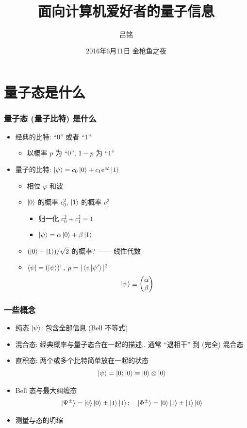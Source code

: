 \documentclass[12pt,hyperref={CJKbookmarks=true},aspectratio=169]{beamer}
\title{面向计算机爱好者的量子信息}
\author{吕铭}
\institute{物理系毕业狗}
\date{2016年6月11日 金枪鱼之夜}
\newcommand\mi{\mathrm{i}}
\newcommand\e{\mathrm{e}} %
\begin{document}
\maketitle


\section{量子态是什么}
\begin{frame}[t]\frametitle{量子态 (量子比特) 是什么}
\begin{itemize}
	\item 经典的比特: ``$0$'' 或者 ``$1$''
	\begin{itemize}
		\item 以概率 $p$ 为 ``$0$'', $1-p$ 为 ``$1$''
	\end{itemize}
	\item 量子的比特: $\ket{\psi} = c_0\ket 0 + c_1\e^{\mi\varphi}\ket 1$
	\begin{itemize}
		\item 相位 $\varphi$ 和波
		\item $\ket 0$ 的概率 $c_0^2$, $\ket 1$ 的概率 $c_1^2$
		\begin{itemize}
			\item 归一化 $c_0^2 + c_1^2 = 1$
			\item $\ket{\psi} = \alpha\ket 0 + \beta\ket 1$
		\end{itemize}
		\item $(\ket 0 + \ket 1)/\sqrt 2$ 的概率? ------ 线性代数
		\item $\bra \psi = (\ket \psi)^\dagger$, $p = |\braket{\psi|\psi'}|^2$
		$$
		\ket\psi \equiv \begin{pmatrix}
			\alpha \\ \beta
		\end{pmatrix}
		$$
	\end{itemize}
\end{itemize}
\end{frame}

\begin{frame}[t]\frametitle{一些概念}
\begin{itemize}
	\item 纯态 $\ket \psi$: 包含全部信息 (Bell 不等式)
	\item 混合态: 经典概率与量子态合在一起的描述.. 
	通常 ``退相干'' 到 (完全) 混合态
	\item 直积态: 两个或多个比特简单放在一起的状态
	$$
	\ket{\psi} = \ket 0 \ket 0 \equiv \ket 0\otimes \ket 0
	$$
	\item Bell 态与最大纠缠态
	$$
	\ket{\Psi^\pm} = \ket 0 \ket 0 \pm \ket 1 \ket 1; \quad
	\ket{\Phi^\pm} = \ket 0 \ket 1 \pm \ket 1 \ket 0
	$$
	\item 测量与态的坍缩
\end{itemize}
\end{frame}
\end{document}
